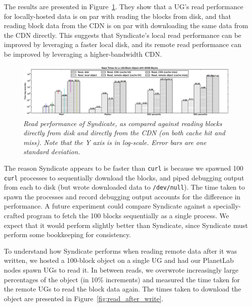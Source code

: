 The results are presented in Figure~\ref{fig:read_performance}.  They show that a UG's read performance for locally-hosted data is on par with reading the blocks from disk, and that reading block data from the CDN is on par with downloading the same data from the CDN directly.  This suggests that Syndicate's local read performance can be improved by leveraging a faster local disk, and its remote read performance can be improved by leveraging a higher-bandwidth CDN.

\begin{figure}
\centerline{\includegraphics[width=1.2\textwidth]{figures/read_performance}}
\label{fig:read_performance}
\caption{\it
Read performance of Syndicate, as compared against reading blocks directly from disk and directly from the CDN (on both cache hit and miss).  Note that the Y axis is in log-scale.  Error bars are one standard deviation.}
\end{figure}

The reason Syndicate appears to be faster than \texttt{curl} is because we spawned 100 \texttt{curl} processes to sequentially download the blocks, and piped debugging output from each to disk (but wrote downloaded data to \texttt{/dev/null}).  The time taken to spawn the processes and record debugging output accounts for the difference in performance.  A future experiment could compare Syndicate against a specially-crafted program to fetch the 100 blocks sequentially as a single process.  We expect that it would perform slightly better than Syndicate, since Syndicate must perform some bookkeeping for consistency.

To understand how Syndicate performs when reading remote data after it was written, we hosted a 100-block object on a single UG and had our PlanetLab nodes spawn UGs to read it.  In between reads, we overwrote increasingly large percentages of the object (in 10\% increments) and measured the time taken for the remote UGs to read the block data again.  The times taken to download the object are presented in Figure~\ref{fig:read_after_write}.

